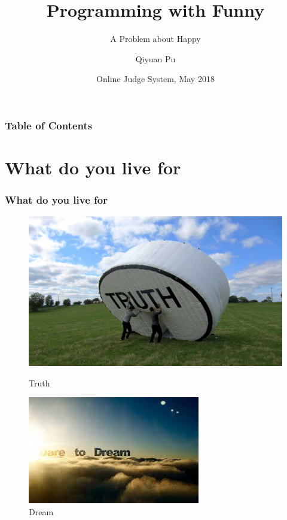 \documentclass{beamer}
\title[\emph{ACM-ICPC}] %
{Programming with Funny}
\subtitle{A Problem about Happy}
\author[Qiyuan, Pu] %
{Qiyuan Pu}
\institute[SWFU] %
{
  School of Big Data and Intelligence Engineering\\
  Southwest Forestry University
}
\date[Fun Programming 2018] %
{Online Judge System, May 2018}
\begin{document}
 
\frame{\titlepage}


\begin{frame}
\frametitle{Table of Contents}
\tableofcontents
\end{frame}

\section{What do you live for}
\begin{frame}
  \frametitle{What do you live for}

  \begin{figure}
    \centering
    \begin{minipage}{0.45\textwidth}
        \centering
        \includegraphics[width=.7\textwidth]{./img/Truth.jpg} %
        \caption{Truth}
        \label{fig:sit-one}
    \end{minipage}\hfill
    \begin{minipage}{0.45\textwidth}
      \centering
      \includegraphics[width=.7\textwidth]{./img/dream.jpeg} 
      \caption{Dream}
      \label{fig:sit-three}
    \end{minipage}\hfill
    \begin{minipage}{0.45\textwidth}

\end{minipage}
\end{figure}
\end{frame}
\end{document}
